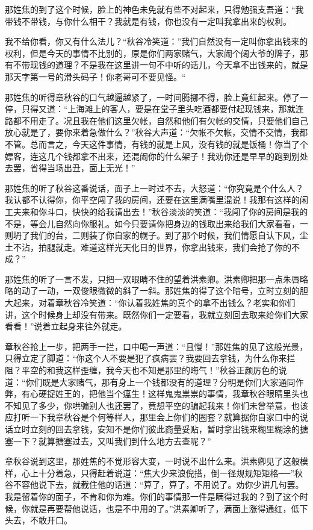 \documentclass[12pt,UTF8]{ctexbook}
\begin{document}
{{{那姓焦的到了这个时候，脸上的神色未免就有些不对起来，只得勉强支吾道：“我带钱不带钱，与你什么相干？我就是有钱，你也没有一定叫我拿出来的权利。

我不给你看，你又有什么法儿？“秋谷冷笑道：”我们自然没有一定叫你拿出钱来的权利，但是今天的事情不比别的，原是你们两家赌气，大家闹个阔大爷的牌子，那有不带现钱的道理？不是我在这里讲一句不中听的话儿，今天拿不出钱来的，就是那天字第一号的滑头码子！你老哥可不要见怪。“

那姓焦的听得章秋谷的口气越逼越紧了，一时间腾挪不得，脸上竟红起来。停了一停，只得又道：“上海滩上的客人，要是在堂子里头吃酒都要付起现钱来，那就连路都不用走了。况且我在他们这里欠帐，自然和他们有欠帐的交情，只要他们自己放心就是了，要你来着急做什么？”秋谷大声道：“欠帐不欠帐，交情不交情，我都不管。总而言之，今天这件事情，有钱的就是上风，没有钱的就是饭桶！你当了个嫖客，连这几个钱都拿不出来，还混闹你的什么架子！我劝你还是早早的跑到别处去罢，省得当场出丑，面上无光！”

那姓焦的听了秋谷这番说话，面子上一时过不去，大怒道：“你究竟是个什么人？我认都不认得你，你平空闯了我的房间，还要在这里满嘴里混说！我那有这样的闲工夫来和你斗口，快快的给我请出去！”秋谷淡淡的笑道：“我闯了你的房间是我的不是，等会儿自然向你服礼。如今只要请你把身边的钱取出来给我们大家看看，一则坍了我们的台，二则装了你自家的幌子。到了那个时候，我们情愿自认下风，尘土不沾，拍腿就走。难道这样光天化日的世界，你拿出钱来，我们会抢了你的不成？”

那姓焦的听了一言不发，只把一双眼睛不住的望着洪素卿。洪素卿把那一点朱唇略略的动了一动，一双俊眼微微的斜了一斜。那姓焦的得了这个暗号，立时立刻的胆大起来，对着章秋谷冷笑道：“你认着我姓焦的真个的拿不出钱么？老实和你们讲，这个时候身上却没有带来。既然你们一定要看，我就立刻回去取来给你们大家看看！”说着立起身来往外就走。

章秋谷抢上一步，把两手一拦，口中喝一声道：“且慢！”那姓焦的见了这般光景，只得立定了脚道：“你这个人不要是犯了疯病罢？我要回去拿钱，为什么你来拦阻？平空的和我这样歪缠，我今天也不知是那里的晦气！”秋谷正颜厉色的说道：“你们既是大家赌气，那有身上一个钱都没有的道理？分明是你们大家通同作弊，有心硬捉姓王的，把他当个瘟生！这样鬼鬼祟祟的事情，我章秋谷眼睛里头也不知见了多少，你哄骗别人也还罢了，竟想平空的骗起我来！你们未曾举意，也该应打听一下我章秋谷是个何等样人，那里会上你们的圈套？就算据你自家口中的说话立时立刻的回去拿钱，安知不是你们彼此商量妥贴，暂时拿出钱来糊里糊涂的搪塞一下？就算搪塞过去，又叫我们到什么地方去查呢？”

章秋谷说到这里，那姓焦的不觉形容大变，一时说不出什么来。洪素卿见了这般模样，心上十分着急，只得赶着说道：“焦大少来浪倪搭，倒一径规规矩矩格──”秋谷不容他说下去，就截住他的话道：“算了，算了，不用说了。劝你少讲几句罢。我是留着你的面子，不肯和你为难。你们的事情那一件是瞒得过我的？到了这个时候，你就是再要帮他说话，也是不中用的了。”洪素卿听了，满面上涨得通红，低下头去，不敢开口。

}}}
\end{document}
